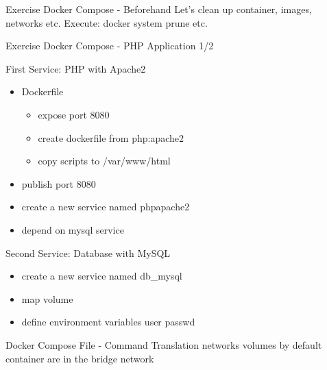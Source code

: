 \documentclass[10pt,aspectratio=\ratio,
compress
]{beamer}
\begin{document}
\begin{frame}{Exercise Docker Compose - Beforehand}
Let's clean up container, images, networks etc.
Execute: docker system prune etc.
\end{frame}

\begin{frame}{Exercise Docker Compose - PHP Application 1/2}


First Service: PHP with Apache2
\begin{itemize}
	\item Dockerfile
	\begin{itemize}
			\item expose port 8080
			\item create dockerfile from php:apache2
			\item copy scripts to /var/www/html
	\end{itemize}
	\item publish port 8080
	\item create a new service named phpapache2
	\item depend on mysql service
\end{itemize}
Second Service: Database with MySQL
\begin{itemize}
	\item create a new service named db\_mysql
	\item map volume
	\item define environment variables user passwd
\end{itemize}

\end{frame}

\begin{frame}{Docker Compose File - Command Translation}
networks
volumes
by default container are in the bridge network
\end{frame}
\end{document}

